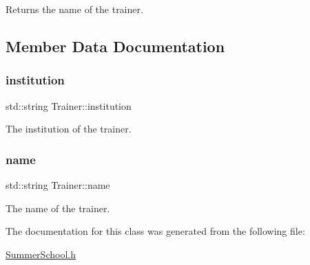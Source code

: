 Returns the name of the trainer. 



\subsection{Member Data Documentation}
\mbox{\label{classTrainer_ae895aa7f146d8bf271399215d4ede36b}} 
\subsubsection{\texorpdfstring{institution}{institution}}
{\footnotesize\ttfamily std\+::string Trainer\+::institution\hspace{0.3cm}{\ttfamily [private]}}



The institution of the trainer. 

\mbox{\label{classTrainer_a6b58d4cfdb8d3482cb2c09dd366a6350}} 
\subsubsection{\texorpdfstring{name}{name}}
{\footnotesize\ttfamily std\+::string Trainer\+::name\hspace{0.3cm}{\ttfamily [private]}}



The name of the trainer. 



The documentation for this class was generated from the following file\+:\begin{DoxyCompactItemize}
\item 
\mbox{\hyperlink{SummerSchool_8h}{Summer\+School.\+h}}\end{DoxyCompactItemize}
